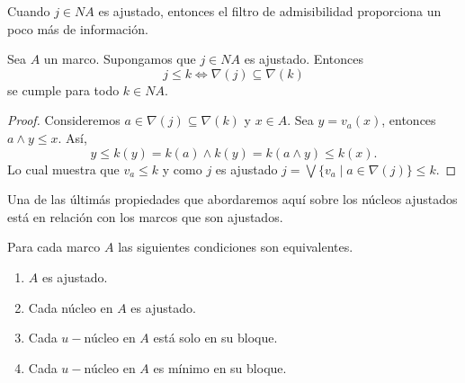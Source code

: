 Cuando $j\in NA$ es ajustado, entonces el filtro de admisibilidad proporciona un poco más de información.

\begin{lem}\label{Lema5.5.9}
    Sea $A$ un marco. Supongamos que $j\in NA$ es ajustado. Entonces 
    \[
    j\leq k\Leftrightarrow \nabla(j)\subseteq \nabla(k)
    \]
    se cumple para todo $k\in NA$.
\end{lem}

\begin{proof}
    Consideremos $a\in \nabla(j)\subseteq \nabla(k)$ y $x\in A$. Sea $y=v_a(x)$, entonces $a\wedge y\leq x$. Así, 
    \[
    y\leq k(y)=k(a)\wedge k(y)=k(a\wedge y)\leq k(x).
    \]
    Lo cual muestra que $v_a\leq k$ y como $j$ es ajustado $j=\bigvee\{v_a\mid a\in \nabla(j)\}\leq k$.
\end{proof}

Una de las últimás propiedades que abordaremos aquí sobre los núcleos ajustados está en relación con los marcos que son ajustados.
\begin{thm}\label{Teorema5.5.10}
    Para cada marco $A$ las siguientes condiciones son equivalentes.
    \begin{enumerate}[$i)$]
        \item $A$ es ajustado.
        \item Cada núcleo en $A$ es ajustado.
        \item Cada $u-$núcleo en $A$ está solo en su bloque.
        \item Cada $u-$núcleo en $A$ es mínimo en su bloque.
    \end{enumerate}
\end{thm}

